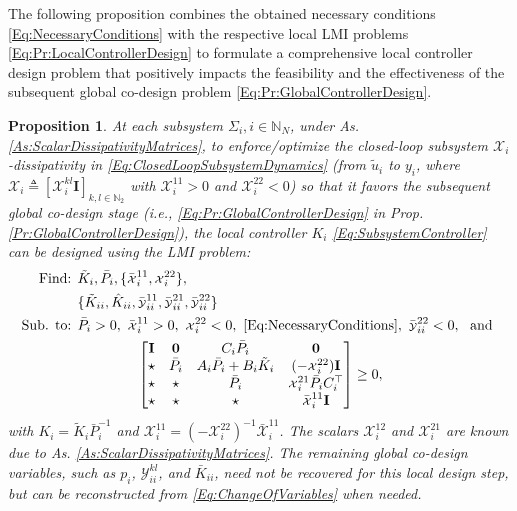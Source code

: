 \documentclass[letterpaper, 10 pt, conference]{ieeeconf}%
\newcommand{\N}{\mathbb{N}}
\newcommand{\T}{\top}
\newcommand{\I}{\mathbf{I}}
\newcommand{\0}{\mathbf{0}}
\newcommand{\X}{\mathcal{X}}
\newcommand{\Y}{\mathcal{Y}}
\newcommand{\x}{{\scriptstyle \X}}
\newcommand{\y}{{\scriptstyle \Y}}
\newcommand{\bm}[1]{\begin{bmatrix}#1\end{bmatrix}}
\newtheorem{proposition}{\textbf{Proposition}}
\begin{document}
The following proposition combines the obtained necessary conditions \eqref{Eq:NecessaryConditions} with the respective local LMI problems \eqref{Eq:Pr:LocalControllerDesign} to formulate a comprehensive local controller design problem that positively impacts the feasibility and the effectiveness of the subsequent global co-design problem \eqref{Eq:Pr:GlobalControllerDesign}. 


\begin{proposition}\label{Pr:LocalControllerDesignRevisit}
At each subsystem $\Sigma_i, i\in\N_N$, under As.  \ref{As:ScalarDissipativityMatrices}, to enforce/optimize the closed-loop subsystem $\X_i$-dissipativity in \eqref{Eq:ClosedLoopSubsystemDynamics} (from $\tilde{u}_i$ to $y_i$, where $\X_i \triangleq [\x_i^{kl}\I]_{k,l\in\N_2}$ with $\x_i^{11} > 0$ and $\x_i^{22} < 0$) so that it favors the subsequent global co-design stage (i.e., \eqref{Eq:Pr:GlobalControllerDesign} in Prop. \ref{Pr:GlobalControllerDesign}), the local controller $K_i$ \eqref{Eq:SubsystemController} can be designed using the LMI problem: 
\begin{equation}\label{Eq:Pr:LocalControllerDesignRevisit}
\begin{aligned}
\mbox{Find: } &\tilde{K}_i, \bar{P}_i, \{\bar{\x}_i^{11}, \x_i^{22}\}, \\ 
&\{\tilde{K}_{ii}, \hat{K}_{ii}, \bar{\y}_{ii}^{11}, \bar{\y}_{ii}^{21}, \bar{\y}_{ii}^{22}\}\\
\mbox{Sub. to: } &\bar{P}_i > 0,\ \bar{\x}_i^{11}>0,\ \x_i^{22} < 0,\ \eqref{Eq:NecessaryConditions},\ \bar{\y}^{22}_{ii} < 0,\ \mbox{ and }\\
\span \bm{ 
\I & \0 & C_i \bar{P}_i & \0 \\
\star & \bar{P}_i & A_i\bar{P}_i+B_i\tilde{K}_i & (-\x_i^{22})\I \\
\star & \star & \bar{P}_i  & \x^{21}_i \bar{P}_i C_i^\T \\
\star & \star & \star & \bar{\x}^{11}_i\I 
} \geq 0,
\end{aligned}
\end{equation}
with $K_i=\tilde{K}_i \bar{P}_i^{-1}$ and $\x_i^{11}=(-\x_i^{22})^{-1}\bar{\x}_i^{11}$. The scalars $\x_i^{12}$ and $\x_i^{21}$ are known due to As. \ref{As:ScalarDissipativityMatrices}. The remaining global co-design variables, such as $p_i$, $\Y_{ii}^{kl}$, and $\bar K_{ii}$, need not be recovered for this local design step, but can be reconstructed from \eqref{Eq:ChangeOfVariables} when needed.
\end{proposition}
\end{document}
